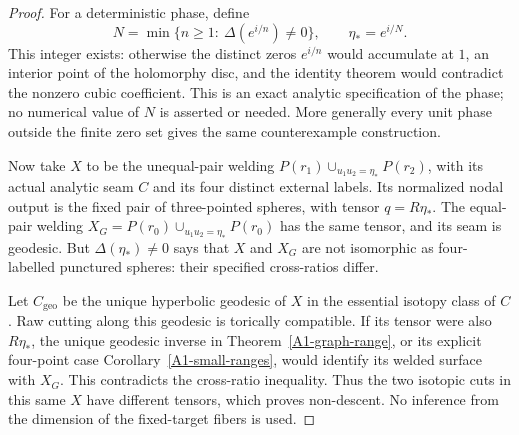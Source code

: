 \begin{proof}
For a deterministic phase, define
\[
 N=\min\{n\geq1:\ \Delta(e^{i/n})\ne0\},
 \qquad \eta_*=e^{i/N}.
\]
This integer exists: otherwise the distinct zeros $e^{i/n}$ would
accumulate at $1$, an interior point of the holomorphy disc, and
the identity theorem would contradict the nonzero cubic coefficient.
This is an exact analytic specification of the phase; no numerical
value of $N$ is asserted or needed. More generally every unit
phase outside the finite zero set gives the same counterexample
construction.

Now take $X$ to be the unequal-pair welding
$P(r_1)\cup_{u_1u_2=\eta_*}P(r_2)$, with its actual analytic
seam $C$ and its four distinct external labels. Its normalized
nodal output is the fixed pair of three-pointed spheres, with
tensor $q=R\eta_*$. The equal-pair welding
$X_G=P(r_0)\cup_{u_1u_2=\eta_*}P(r_0)$ has the same tensor,
and its seam is geodesic. But
$\Delta(\eta_*)\ne0$ says that $X$ and $X_G$ are not isomorphic
as four-labelled punctured spheres: their specified cross-ratios
differ.

Let $C_{\mathrm{geo}}$ be the unique hyperbolic geodesic of $X$
in the essential isotopy class of $C$. Raw cutting along this
geodesic is torically compatible. If its tensor were also
$R\eta_*$, the unique geodesic inverse in
Theorem~\ref{A1-graph-range}, or its explicit four-point case
Corollary~\ref{A1-small-ranges}, would identify its welded surface
with $X_G$. This contradicts the cross-ratio inequality. Thus
the two isotopic cuts in this same $X$ have different tensors,
which proves non-descent. No inference from the dimension of
the fixed-target fibers is used.
\end{proof}
